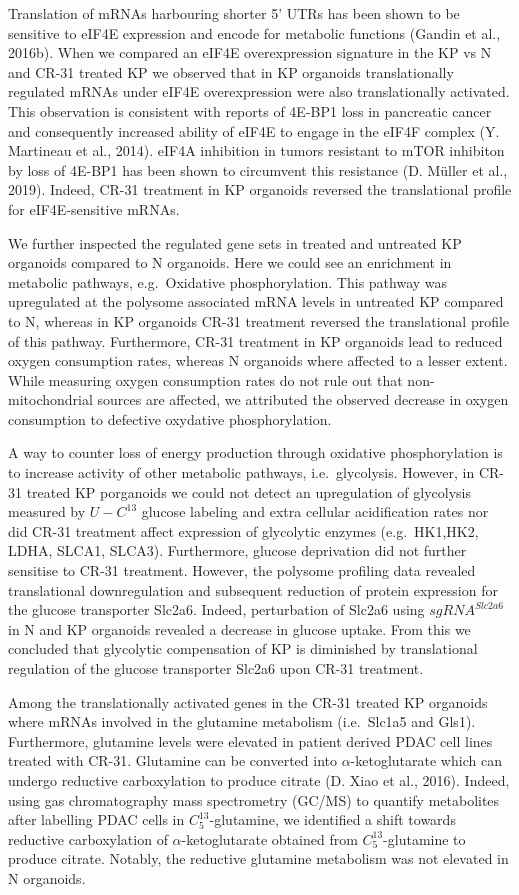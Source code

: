 \documentclass[12pt,openany]{book}
\begin{document}
Translation of mRNAs harbouring shorter 5' UTRs has been shown to be
sensitive to eIF4E expression and encode for metabolic functions (Gandin
et al., 2016b). When we compared an eIF4E overexpression signature in
the KP vs N and CR-31 treated KP we observed that in KP organoids
translationally regulated mRNAs under eIF4E overexpression were also
translationally activated. This observation is consistent with reports
of 4E-BP1 loss in pancreatic cancer and consequently increased ability
of eIF4E to engage in the eIF4F complex (Y. Martineau et al., 2014).
eIF4A inhibition in tumors resistant to mTOR inhibiton by loss of 4E-BP1
has been shown to circumvent this resistance (D. Müller et al., 2019).
Indeed, CR-31 treatment in KP organoids reversed the translational
profile for eIF4E-sensitive mRNAs.

We further inspected the regulated gene sets in treated and untreated KP
organoids compared to N organoids. Here we could see an enrichment in
metabolic pathways, e.g.~Oxidative phosphorylation. This pathway was
upregulated at the polysome associated mRNA levels in untreated KP
compared to N, whereas in KP organoids CR-31 treatment reversed the
translational profile of this pathway. Furthermore, CR-31 treatment in
KP organoids lead to reduced oxygen consumption rates, whereas N
organoids where affected to a lesser extent. While measuring oxygen
consumption rates do not rule out that non-mitochondrial sources are
affected, we attributed the observed decrease in oxygen consumption to
defective oxydative phosphorylation.

A way to counter loss of energy production through oxidative
phosphorylation is to increase activity of other metabolic pathways,
i.e.~glycolysis. However, in CR-31 treated KP porganoids we could not
detect an upregulation of glycolysis measured by \(U-C^{13}\) glucose
labeling and extra cellular acidification rates nor did CR-31 treatment
affect expression of glycolytic enzymes (e.g.~HK1,HK2, LDHA, SLCA1,
SLCA3). Furthermore, glucose deprivation did not further sensitise to
CR-31 treatment. However, the polysome profiling data revealed
translational downregulation and subsequent reduction of protein
expression for the glucose transporter Slc2a6. Indeed, perturbation of
Slc2a6 using \(sgRNA^{Slc2a6}\) in N and KP organoids revealed a
decrease in glucose uptake. From this we concluded that glycolytic
compensation of KP is diminished by translational regulation of the
glucose transporter Slc2a6 upon CR-31 treatment.

Among the translationally activated genes in the CR-31 treated KP
organoids where mRNAs involved in the glutamine metabolism (i.e.~Slc1a5
and Gls1). Furthermore, glutamine levels were elevated in patient
derived PDAC cell lines treated with CR-31. Glutamine can be converted
into \(\alpha\)-ketoglutarate which can undergo reductive carboxylation
to produce citrate (D. Xiao et al., 2016). Indeed, using gas
chromatography mass spectrometry (GC/MS) to quantify metabolites after
labelling PDAC cells in \(C_5^{13}\)-glutamine, we identified a shift
towards reductive carboxylation of \(\alpha\)-ketoglutarate obtained
from \(C_5^{13}\)-glutamine to produce citrate. Notably, the reductive
glutamine metabolism was not elevated in N organoids.
\end{document}
